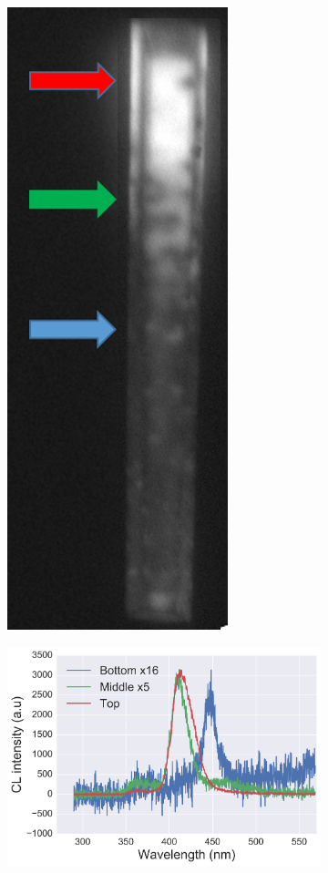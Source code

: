 \begin{figure}[!th]
	\begin{subfigure}[b]{0.35\textwidth}
		\centering
		\includegraphics[width=0.5\linewidth]{Figs/Ch6/CL-linescanloc}
		\caption{}
		
	\end{subfigure}%
	\hspace*{-1cm}
	\begin{subfigure}[b]{0.6\textwidth}
		\centering
		\includegraphics[width=1\linewidth]{Figs/Ch6/C6364}
		\caption{}
	\end{subfigure}%
	

\end{figure}
